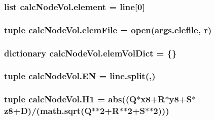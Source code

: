 \subsubsection[{element}]{\setlength{\rightskip}{0pt plus 5cm}list calc\+Node\+Vol.\+element = {\bf line}\mbox{[}0\mbox{]}}\label{namespacecalcNodeVol_acb063a8c5b2a22cd96a1962924082680}
\hypertarget{namespacecalcNodeVol_a0ba6213bb93ac529e94dce28a5f6c356}{}
\subsubsection[{elem\+File}]{\setlength{\rightskip}{0pt plus 5cm}tuple calc\+Node\+Vol.\+elem\+File = open(args.\+elefile, \textquotesingle{}r\textquotesingle{})}\label{namespacecalcNodeVol_a0ba6213bb93ac529e94dce28a5f6c356}
\hypertarget{namespacecalcNodeVol_a8c3ec1be52f16fe4948bb7b04a910616}{}
\subsubsection[{elem\+Vol\+Dict}]{\setlength{\rightskip}{0pt plus 5cm}dictionary calc\+Node\+Vol.\+elem\+Vol\+Dict = \{\}}\label{namespacecalcNodeVol_a8c3ec1be52f16fe4948bb7b04a910616}
\hypertarget{namespacecalcNodeVol_a3584f1bca5e9fa90fe1ccd12b5505829}{}
\subsubsection[{E\+N}]{\setlength{\rightskip}{0pt plus 5cm}tuple calc\+Node\+Vol.\+E\+N = line.\+split(\textquotesingle{},\textquotesingle{})}\label{namespacecalcNodeVol_a3584f1bca5e9fa90fe1ccd12b5505829}
\hypertarget{namespacecalcNodeVol_aa422b64139507266ef488bb6812b725b}{}
\subsubsection[{H1}]{\setlength{\rightskip}{0pt plus 5cm}tuple calc\+Node\+Vol.\+H1 = abs((Q$\ast${\bf x8}+R$\ast${\bf y8}+S$\ast${\bf z8}+{\bf D})/(math.\+sqrt(Q$\ast$$\ast$2+R$\ast$$\ast$2+S$\ast$$\ast$2)))}\label{namespacecalcNodeVol_aa422b64139507266ef488bb6812b725b}
\hypertarget{namespacecalcNodeVol_a3dd3091d10a8de8da0a378469ab901f4}{}
